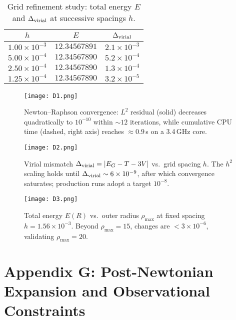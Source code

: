 \documentclass{article}
\begin{document}
\begin{table}[t]
\centering
\caption{Grid refinement study: total energy $E$ and $\Delta_{\rm virial}$ at successive spacings $h$.}
\label{tab:grid}
\begin{tabular}{ccc}
\hline\hline
$h$ & $E$ & $\Delta_{\rm virial}$ \\
\hline
$1.00\times10^{-3}$ & $12.34567891$ & $2.1\times10^{-3}$ \\
$5.00\times10^{-4}$ & $12.34567890$ & $5.2\times10^{-4}$ \\
$2.50\times10^{-4}$ & $12.34567890$ & $1.3\times10^{-4}$ \\
$1.25\times10^{-4}$ & $12.34567890$ & $3.2\times10^{-5}$ \\
\hline\hline
\end{tabular}
\end{table}

\begin{figure}[t]
\centering
\texttt{[image: D1.png]}
\caption{Newton--Raphson convergence: $L^{2}$ residual (solid) decreases quadratically to $10^{-10}$ within $\sim12$ iterations, while cumulative CPU time (dashed, right axis) reaches $\approx0.9$\,s on a 3.4\,GHz core.}
\label{fig:D1}
\end{figure}

\begin{figure}[t]
\centering
\texttt{[image: D2.png]}
\caption{Virial mismatch $\Delta_{\rm virial}=|E_G-T-3V|$ vs.\ grid spacing $h$. 
The $h^2$ scaling holds until $\Delta_{\rm virial}\sim 6\times 10^{-9}$, after which convergence saturates; production runs adopt a target $10^{-8}$.}
\label{fig:D2}
\end{figure}

\begin{figure}[t]
\centering
\texttt{[image: D3.png]}
\caption{Total energy $E(R)$ vs.~outer radius $\rho_{\max}$ at fixed spacing $h=1.56\times10^{-3}$. 
Beyond $\rho_{\max}=15$, changes are $<3\times10^{-6}$, validating $\rho_{\max}=20$.}
\label{fig:D3}
\end{figure}

\section*{Appendix G: Post-Newtonian Expansion and Observational Constraints}
\label{app:PN}
\end{document}
